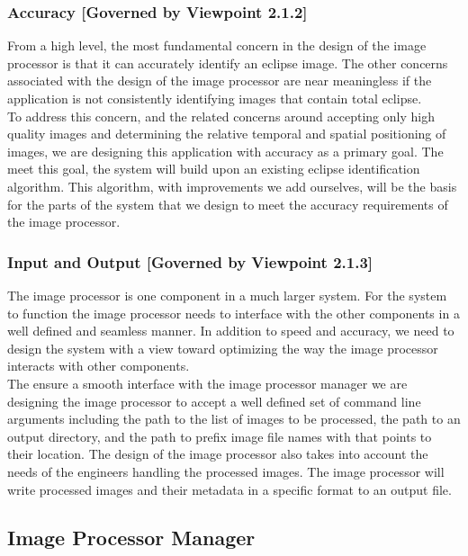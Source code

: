 \documentclass[10pt, onecolumn, draftclsnofoot, letterpaper, compsoc]{IEEEtran}
\begin{document}
\subsubsection{Accuracy [Governed by Viewpoint 2.1.2]}

From a high level, the most fundamental concern in the design of the image
processor is that it can accurately identify an eclipse image. The other
concerns associated with the design of the image processor are near meaningless
if the application is not consistently identifying images that contain total
eclipse.\\

To address this concern, and the related concerns around accepting only high
quality images and determining the relative temporal and spatial positioning of
images, we are designing this application with accuracy as a primary goal. The
meet this goal, the system will build upon an existing eclipse identification
algorithm. This algorithm, with improvements we add ourselves, will be the basis
for the parts of the system that we design to meet the accuracy requirements of
the image processor.\\

\subsubsection{Input and Output [Governed by Viewpoint 2.1.3]}

The image processor is one component in a much larger system. For the system to
function the image processor needs to interface with the other components in a
well defined and seamless manner. In addition to speed and accuracy, we need to
design the system with a view toward optimizing the way the image processor
interacts with other components.\\

The ensure a smooth interface with the image processor manager we are designing
the image processor to accept a well defined set of command line arguments
including the path to the list of images to be processed, the path to an output
directory, and the path to prefix image file names with that points to their
location. The design of the image processor also takes into account the needs of
the engineers handling the processed images. The image processor will write
processed images and their metadata in a specific format to an output file.\\

\subsection{Image Processor Manager}
\end{document}
